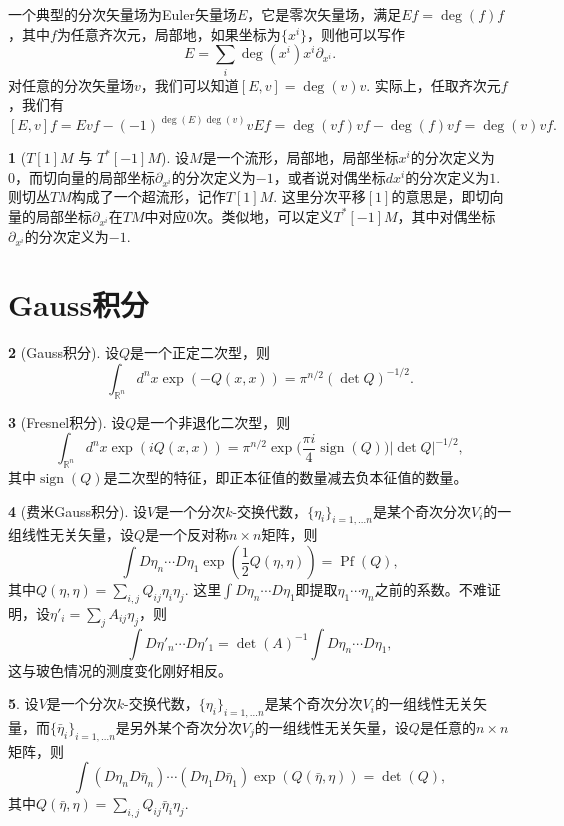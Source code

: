 \documentclass[11pt]{article}
\theoremstyle{definition}
\newtheorem{para}{}[section]
\theoremstyle{plain}
\begin{document}
一个典型的分次矢量场为Euler矢量场$E$，它是零次矢量场，满足$Ef=\deg(f)f$，其中$f$为任意齐次元，局部地，如果坐标为$\{x^i\}$，则他可以写作
\[
    E=\sum_i \deg(x^i)x^i\partial_{x^i}.
\]
对任意的分次矢量场$v$，我们可以知道$[E,v]=\deg(v)v$. 实际上，任取齐次元$f$，我们有
\[
    [E,v]f=Evf-(-1)^{\deg(E) \deg(v)}vEf=\deg(vf)vf-\deg(f)vf=\deg(v)vf.
\]

\begin{para}[${T[1]M}$ 与 ${T^*[-1]M}$]
设$M$是一个流形，局部地，局部坐标$x^i$的分次定义为0，而切向量的局部坐标$\partial_{x^i}$的分次定义为$-1$，或者说对偶坐标$dx^i$的分次定义为$1$. 则切丛$TM$构成了一个超流形，记作$T[1]M$. 这里分次平移$[1]$的意思是，即切向量的局部坐标$\partial_{x^i}$在$TM$中对应$0$次。类似地，可以定义${T^*[-1]M}$，其中对偶坐标$\partial_{x^i}$的分次定义为$-1$.
\end{para}

\section{Gauss积分}

\begin{para}[Gauss积分]
    设$Q$是一个正定二次型，则
    \[
        \int_{\mathbb R^n}d^nx \exp(-Q(x,x))=\pi^{n/2}(\det Q)^{-1/2}.
    \]
\end{para}

\begin{para}[Fresnel积分]
    设$Q$是一个非退化二次型，则
    \[
        \int_{\mathbb R^n}d^nx \exp(iQ(x,x))=\pi^{n/2}\exp\biggl(\frac{\pi i}{4} \operatorname{sign}(Q)\biggr)|\det Q|^{-1/2},
    \]
    其中$\operatorname{sign}(Q)$是二次型的特征，即正本征值的数量减去负本征值的数量。
\end{para}

\begin{para}[费米Gauss积分]
    设$V$是一个分次$k$-交换代数，$\{\eta_i\}_{i=1,\dots n}$是某个奇次分次$V_i$的一组线性无关矢量，设$Q$是一个反对称$n\times n$矩阵，则
    \[
        \int D\eta_n\cdots D\eta_1 \exp\left(\frac{1}{2}Q(\eta,\eta)\right)=\operatorname{Pf}(Q),
    \]
    其中$Q(\eta,\eta)=\sum_{i,j}Q_{ij}\eta_i\eta_j$.
    这里$\int D\eta_n\cdots D\eta_1$即提取$\eta_1\cdots \eta_n$之前的系数。不难证明，设$\eta'_i=\sum_jA_{ij}\eta_j$，则
    \[
        \int D\eta'_n\cdots D\eta'_1=\det(A)^{-1}\int D\eta_n\cdots D\eta_1,
    \]
    这与玻色情况的测度变化刚好相反。
\end{para}

\begin{para}
    设$V$是一个分次$k$-交换代数，$\{\eta_i\}_{i=1,\dots n}$是某个奇次分次$V_i$的一组线性无关矢量，而$\{\bar \eta_i\}_{i=1,\dots n}$是另外某个奇次分次$V_j$的一组线性无关矢量，设$Q$是任意的$n\times n$矩阵，则
    \[
        \int (D\eta_nD\bar\eta_n)\cdots (D\eta_1D\bar\eta_1) \exp\left(Q(\bar\eta,\eta)\right)=\det(Q),
    \]
    其中$Q(\bar\eta,\eta)=\sum_{i,j}Q_{ij}\bar\eta_i\eta_j$.
\end{para}
\end{document}
